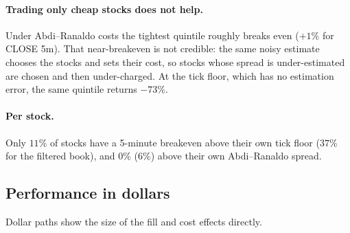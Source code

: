\documentclass[11pt,a4paper]{article}
\begin{document}
\paragraph{Trading only cheap stocks does not help.} Under Abdi--Ranaldo costs the tightest quintile
roughly breaks even ($+1\%$ for CLOSE 5m). That near-breakeven is not credible: the same noisy estimate chooses the
stocks and sets their cost, so stocks whose spread is under-estimated are chosen and then under-charged.
At the tick floor, which has no estimation error, the same quintile returns $-73\%$.

\paragraph{Per stock.} Only $11\%$ of stocks have a 5-minute breakeven above their own tick floor
($37\%$ for the filtered book), and $0\%$ ($6\%$) above their own Abdi--Ranaldo spread.

\subsection{Performance in dollars}

Dollar paths show the size of the fill and cost effects directly.
\end{document}
